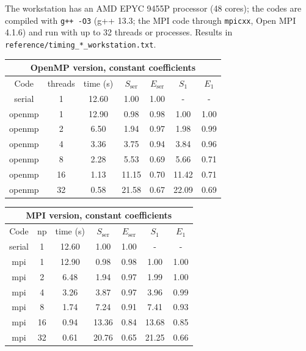 \documentclass[11pt]{article}
\begin{document}
The workstation has an AMD EPYC 9455P processor (48 cores); the codes are compiled with \texttt{g++ -O3} (g++ 13.3; the MPI code through \texttt{mpicxx}, Open MPI 4.1.6) and run with up to 32 threads or processes. Results in \texttt{reference/timing\_*\_workstation.txt}.
\begin{table}[H]\footnotesize
\begin{center}
\begin{tabular}{|c|c|c|c|c|c|c|} \hline
\multicolumn{7}{|c|}{OpenMP version, constant coefficients} \\ \hline
Code & threads & time (s) & $S_{\text{ser}}$ & $E_{\text{ser}}$ & $S_1$ & $E_1$ \\ \hline
serial & 1 & 12.60 & 1.00 & 1.00 & - & - \\
openmp & 1 & 12.90 & 0.98 & 0.98 & 1.00 & 1.00 \\
openmp & 2 & 6.50 & 1.94 & 0.97 & 1.98 & 0.99 \\
openmp & 4 & 3.36 & 3.75 & 0.94 & 3.84 & 0.96 \\
openmp & 8 & 2.28 & 5.53 & 0.69 & 5.66 & 0.71 \\
openmp & 16 & 1.13 & 11.15 & 0.70 & 11.42 & 0.71 \\
openmp & 32 & 0.58 & 21.58 & 0.67 & 22.09 & 0.69 \\
\hline
\end{tabular}
\end{center}
\end{table}
\begin{table}[H]\footnotesize
\begin{center}
\begin{tabular}{|c|c|c|c|c|c|c|} \hline
\multicolumn{7}{|c|}{MPI version, constant coefficients} \\ \hline
Code & np & time (s) & $S_{\text{ser}}$ & $E_{\text{ser}}$ & $S_1$ & $E_1$ \\ \hline
serial & 1 & 12.60 & 1.00 & 1.00 & - & - \\
mpi & 1 & 12.90 & 0.98 & 0.98 & 1.00 & 1.00 \\
mpi & 2 & 6.48 & 1.94 & 0.97 & 1.99 & 1.00 \\
mpi & 4 & 3.26 & 3.87 & 0.97 & 3.96 & 0.99 \\
mpi & 8 & 1.74 & 7.24 & 0.91 & 7.41 & 0.93 \\
mpi & 16 & 0.94 & 13.36 & 0.84 & 13.68 & 0.85 \\
mpi & 32 & 0.61 & 20.76 & 0.65 & 21.25 & 0.66 \\
\hline
\end{tabular}
\end{center}
\end{table}
\end{document}
